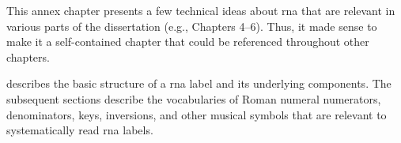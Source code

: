 
This annex chapter presents a few technical ideas about
\gls{rna} that are relevant in various parts of the
dissertation (e.g., Chapters 4--6). Thus, it made sense to
make it a self-contained chapter that could be referenced
throughout other chapters.

 describes
the basic structure of a \gls{rna} label and its underlying
components. The subsequent sections describe the
vocabularies of Roman numeral numerators, denominators,
keys, inversions, and other musical symbols that are
relevant to systematically read \gls{rna} labels.
